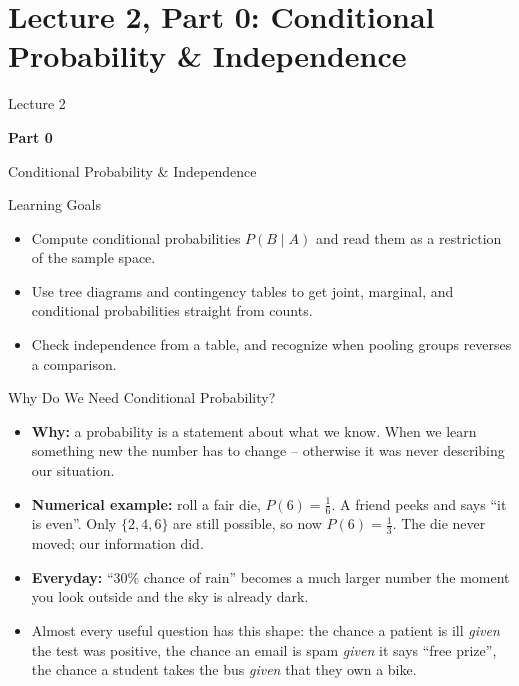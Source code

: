 \section{Lecture 2, Part 0: Conditional Probability \& Independence}

\begin{frame}
\vfill
\centering
{\color{RLBlue}\large Lecture 2}

\vspace{0.3em}
{\color{RLBlue}\Large\bfseries Part 0}

\vspace{0.6em}
{\Large Conditional Probability \& Independence}
\vfill
\end{frame}

\begin{frame}{Learning Goals}
\begin{itemize}
  \item Compute conditional probabilities $P(B \mid A)$ and read them as a restriction of the sample space.
  \pause
  \item Use tree diagrams and contingency tables to get joint, marginal, and conditional probabilities straight from counts.
  \pause
  \item Check independence from a table, and recognize when pooling groups reverses a comparison.
\end{itemize}
\end{frame}

\begin{frame}{Why Do We Need Conditional Probability?}
\begin{itemize}
  \item \textbf{Why:} a probability is a statement about what we know. When we learn something new the number has to change -- otherwise it was never describing our situation.
  \pause
  \item \textbf{Numerical example:} roll a fair die, $P(6) = \tfrac16$. A friend peeks and says ``it is even''. Only $\{2,4,6\}$ are still possible, so now $P(6) = \tfrac13$. The die never moved; our information did.
  \pause
  \item \textbf{Everyday:} ``30\% chance of rain'' becomes a much larger number the moment you look outside and the sky is already dark.
  \pause
  \item Almost every useful question has this shape: the chance a patient is ill \emph{given} the test was positive, the chance an email is spam \emph{given} it says ``free prize'', the chance a student takes the bus \emph{given} that they own a bike.
\end{itemize}
\end{frame}

